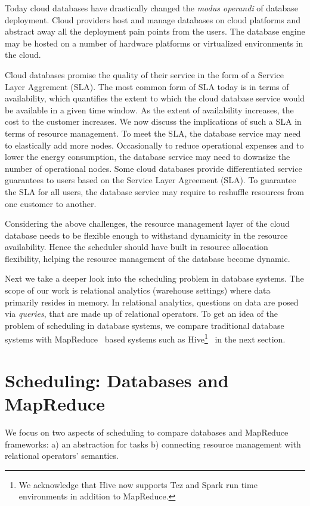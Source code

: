Today cloud databases have drastically changed the \textit{modus operandi} of database deployment.
Cloud providers host and manage databases on cloud platforms and abstract away all the deployment pain points from the users.
The database engine may be hosted on a number of hardware platforms or virtualized environments in the cloud.

Cloud databases promise the quality of their service in the form of a Service Layer Aggrement (SLA).
The most common form of SLA today is in terms of availability, which quantifies the extent to which the cloud database service would be available in a given time window. 
As the extent of availability increases, the cost to the customer increases.
We now discuss the implications of such a SLA in terms of resource management.
To meet the SLA, the database service may need to elastically add more nodes. 
Occasionally to reduce operational expenses and to lower the energy consumption, the database service may need to downsize the number of operational nodes.
Some cloud databases provide differentiated service guarantees to users based on the Service Layer Agreement (SLA). 
To guarantee the SLA for all users, the database service may require to reshuffle resources from one customer to another. 

Considering the above challenges, the resource management layer of the cloud database needs to be flexible enough to withstand dynamicity in the resource availability.
Hence the scheduler should have built in resource allocation flexibility, helping the resource management of the database become dynamic.

Next we take a deeper look into the scheduling problem in database systems.
The scope of our work is relational analytics (warehouse settings) where data primarily resides in memory. 
In relational analytics, questions on data are posed via \textit{queries}, that are made up of relational operators. 
To get an idea of the problem of scheduling in database systems, we compare traditional database systems with MapReduce~\cite{mapreduce} based systems such as Hive\footnote{We acknowledge that Hive now supports Tez and Spark run time environments in addition to MapReduce.}~\cite{thusoo2010hive} in the next section.

\section{Scheduling: Databases and MapReduce}
We focus on two aspects of scheduling to compare databases and MapReduce frameworks: a) an abstraction for tasks b) connecting resource management with relational operators' semantics.

